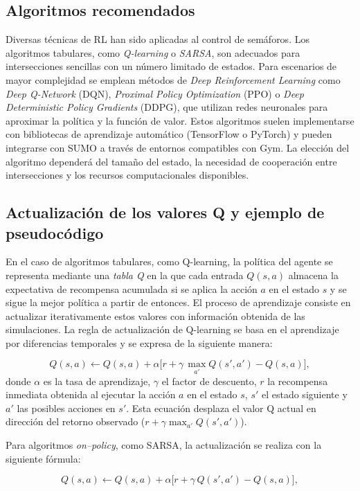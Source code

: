 \subsection*{Algoritmos recomendados}

Diversas técnicas de RL han sido aplicadas al control de
semáforos. Los algoritmos tabulares, como \emph{Q-learning} o
\emph{SARSA}, son adecuados para intersecciones sencillas con un
número limitado de estados. Para escenarios de mayor complejidad se
emplean métodos de \emph{Deep Reinforcement Learning} como \emph{Deep
Q-Network} (DQN), \emph{Proximal Policy Optimization} (PPO) o
\emph{Deep Deterministic Policy Gradients} (DDPG), que utilizan redes
neuronales para aproximar la política y la función de valor. Estos
algoritmos suelen implementarse con bibliotecas de aprendizaje
automático (TensorFlow o PyTorch) y pueden integrarse con SUMO a
través de entornos compatibles con Gym. La elección del algoritmo
dependerá del tamaño del estado, la necesidad de cooperación entre
intersecciones y los recursos computacionales disponibles.

\subsection*{Actualización de los valores Q y ejemplo de pseudocódigo}

En el caso de algoritmos tabulares, como Q-learning, la política del agente se
representa mediante una \emph{tabla Q} en la que cada entrada $Q(s,a)$
almacena la expectativa de recompensa acumulada si se aplica la acción $a$ en
el estado $s$ y se sigue la mejor política a partir de entonces.
El proceso de aprendizaje consiste en actualizar iterativamente estos valores
con información obtenida de las simulaciones.  La regla de actualización de
Q-learning se basa en el aprendizaje por diferencias temporales y se expresa
de la siguiente manera:

\[
  Q(s,a) \leftarrow Q(s,a) + \alpha \bigl[r + \gamma\,\max_{a'} Q(s',a') - Q(s,a)\bigr],
\]
donde $\alpha$ es la tasa de aprendizaje, $\gamma$ el factor de descuento,
$r$ la recompensa inmediata obtenida al ejecutar la acción $a$ en el estado $s$,
$s'$ el estado siguiente y $a'$ las posibles acciones en $s'$.  Esta
ecuación desplaza el valor Q actual en dirección del retorno observado
($r + \gamma \max_{a'} Q(s',a')$).

Para algoritmos \emph{on--policy}, como SARSA, la actualización se realiza con la
siguiente fórmula:

\[
  Q(s,a) \leftarrow Q(s,a) + \alpha\bigl[r + \gamma\,Q(s',a') - Q(s,a)\bigr],
\]

